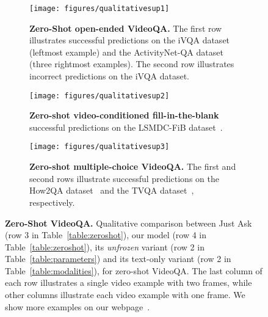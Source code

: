 \begin{figure*}[!t]
\centering
\begin{subfigure}{1.\linewidth}
\caption{\textbf{Zero-Shot open-ended VideoQA.}
The first row illustrates successful predictions on the iVQA dataset~\cite{yang2021just} (leftmost example) and the ActivityNet-QA dataset~\cite{yu2019activitynet} (three rightmost examples).
The second row illustrates incorrect predictions on the iVQA dataset.}
\label{fig:qualitativesup1}
\vspace{-0.2cm}
\texttt{[image: figures/qualitativesup1]}
\end{subfigure}
\begin{subfigure}{1.\linewidth}
\caption{\textbf{Zero-shot video-conditioned fill-in-the-blank} successful predictions on the LSMDC-FiB dataset~\cite{maharaj2017dataset}.}
\label{fig:qualitativesup2}
\vspace{-0.2cm}
\texttt{[image: figures/qualitativesup2]}
\end{subfigure}
\begin{subfigure}{1.\linewidth}
\vspace{+0.2cm}
\caption{\textbf{Zero-shot multiple-choice VideoQA.} The first and second rows illustrate successful predictions on the How2QA dataset~\cite{li2020hero} and the TVQA dataset~\cite{lei2018tvqa}, respectively.}
\label{fig:qualitativesup3}
\vspace{-0.2cm}
\texttt{[image: figures/qualitativesup3]}
\end{subfigure}
\vspace{-0.4cm}
\caption{\small \textbf{Zero-Shot VideoQA.} Qualitative comparison between Just Ask~\cite{Yang2022LearningTA} (row 3 in Table~\ref{table:zeroshot}), our model (row 4 in Table~\ref{table:zeroshot}), its \textit{unfrozen} variant (row 2 in Table~\ref{table:parameters}) and its text-only variant (row 2 in Table~\ref{table:modalities}), for zero-shot VideoQA.
The last column of each row illustrates a single video example with two frames, while other columns illustrate each video example with one frame.
We show more examples on our webpage~\cite{frozenbilmwebpage}.}
\label{fig:qualitativesup}
\end{figure*}


